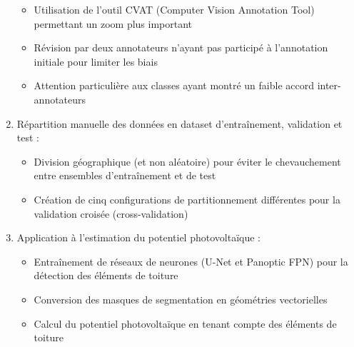 \begin{enumerate}
    \begin{itemize}
        \item Utilisation de l'outil CVAT (Computer Vision Annotation Tool) permettant un zoom plus important
        \item Révision par deux annotateurs n'ayant pas participé à l'annotation initiale pour limiter les biais
        \item Attention particulière aux classes ayant montré un faible accord inter-annotateurs
    \end{itemize}
    \item Répartition manuelle des données en dataset d'entraînement, validation et test :
    \begin{itemize}
        \item Division géographique (et non aléatoire) pour éviter le chevauchement entre ensembles d'entraînement et de test
        \item Création de cinq configurations de partitionnement différentes pour la validation croisée (cross-validation)
    \end{itemize}

    \item Application à l'estimation du potentiel photovoltaïque :
    \begin{itemize}
        \item Entraînement de réseaux de neurones (U-Net et Panoptic FPN) pour la détection des éléments de toiture
        \item Conversion des masques de segmentation en géométries vectorielles
        \item Calcul du potentiel photovoltaïque en tenant compte des éléments de toiture
    \end{itemize}
\end{enumerate}

